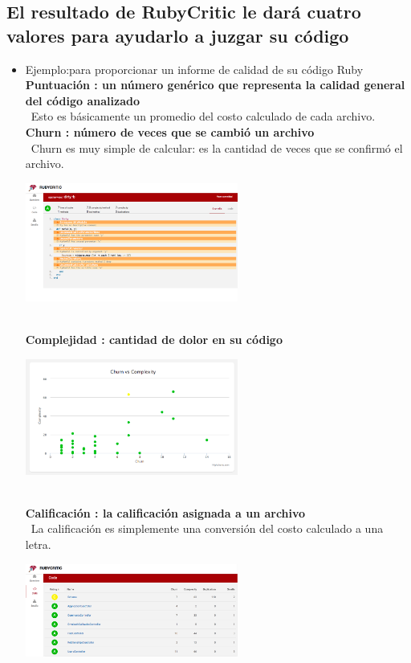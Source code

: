 \documentclass[twoside,twocolumn]{article}
\begin{document}
\subsection {El resultado de RubyCritic le dará cuatro valores para ayudarlo a juzgar su código}
 
\begin{itemize}
\item  Ejemplo:para proporcionar un informe de calidad de su código Ruby
\\ \textbf{ Puntuación : un número genérico que representa la calidad general del código analizado }
\\ \ Esto es básicamente un promedio del costo calculado de cada archivo.
\\ \textbf{ Churn : número de veces que se cambió un archivo}
\\ \ Churn es muy simple de calcular: es la cantidad de veces que se confirmó el archivo.
\begin{center}
	\includegraphics[width=7cm]{./Imagenes/5} 
	\end{center}
\\ \textbf{ Complejidad : cantidad de dolor en su código}
\begin{center}
	\includegraphics[width=7cm]{./Imagenes/6} 
	\end{center}
\\ \textbf{ Calificación : la calificación asignada a un archivo}
\\ \ La calificación es simplemente una conversión del costo calculado a una letra.
\begin{center}
	\includegraphics[width=7cm]{./Imagenes/rating} 
	\end{center}
\end{itemize}
\end{document}

